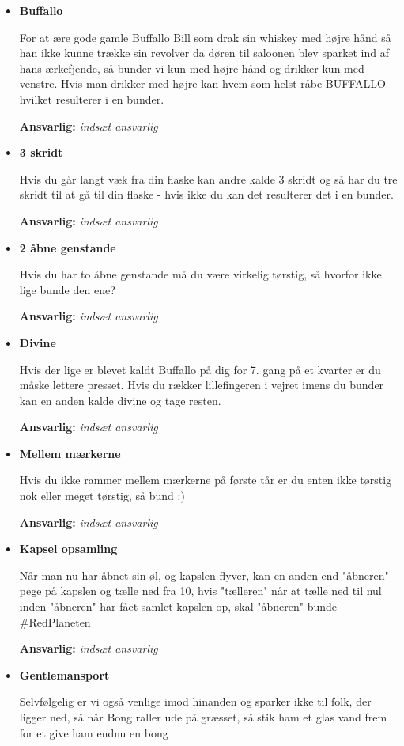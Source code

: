 \documentclass[../../../main.tex]{subfiles}
\begin{document}
\begin{itemize}
    \item \textbf{Buffallo} 
    
    For at ære gode gamle Buffallo Bill som drak sin whiskey med højre hånd så han ikke kunne trække sin revolver da døren til saloonen blev sparket ind af hans ærkefjende, så bunder vi kun med højre hånd og drikker kun med venstre. Hvis man drikker med højre kan hvem som helst råbe BUFFALLO hvilket resulterer i en bunder.
    
    \textbf{Ansvarlig:} \textit{indsæt ansvarlig}
    
    \item \textbf{3 skridt}
    
    Hvis du går langt væk fra din flaske kan andre kalde 3 skridt og så har du tre skridt til at gå til din flaske - hvis ikke du kan det resulterer det i en bunder.
    
    \textbf{Ansvarlig:} \textit{indsæt ansvarlig}
    
    \item \textbf{2 åbne genstande} 

    Hvis du har to åbne genstande må du være virkelig tørstig, så hvorfor ikke lige bunde den ene?
    
    \textbf{Ansvarlig:} \textit{indsæt ansvarlig}

    \item \textbf{Divine} 

    Hvis der lige er blevet kaldt Buffallo på dig for 7. gang på et kvarter er du måske lettere presset. Hvis du rækker lillefingeren i vejret imens du bunder kan en anden kalde divine og tage resten.
    
    \textbf{Ansvarlig:} \textit{indsæt ansvarlig}

    \item \textbf{Mellem mærkerne} 
    
    Hvis du ikke rammer mellem mærkerne på første tår er du enten ikke tørstig nok eller meget tørstig, så bund :)
    
    \textbf{Ansvarlig:} \textit{indsæt ansvarlig}

    \item \textbf{Kapsel opsamling} 
    
    Når man nu har åbnet sin øl, og kapslen flyver, kan en anden end "åbneren" pege på kapslen og tælle ned fra 10, hvis "tælleren" når at tælle ned til nul inden "åbneren" har fået samlet kapslen op, skal "åbneren" bunde \#RedPlaneten
    
    \textbf{Ansvarlig:} \textit{indsæt ansvarlig}
    
    \item \textbf{Gentlemansport}
    
    Selvfølgelig er vi også venlige imod hinanden og sparker ikke til folk, der ligger ned, så når Bong raller ude på græsset, så stik ham et glas vand frem for et give ham endnu en bong
\end{itemize}
\end{document}
